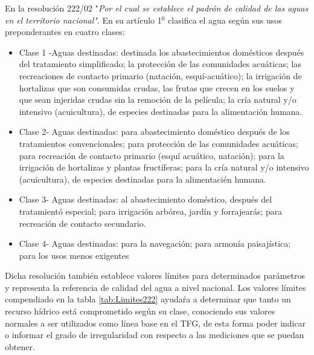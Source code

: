 En la resoluci\'on 222/02 "\textit{Por el cual se establece el padr\'on de calidad de las aguas en el territorio nacional"}. En su art\'iculo 1$^{0}$ clasifica el agua seg\'un sus usos preponderantes en cuatro clases:\cite{la-secretaria-del-ambiente-2002}
\begin{itemize}
    \item Clase 1 -Aguas destinadas: 
    destinada los abastecimientos dom\'esticos despu\'es del tratamiento simplificado; 
    la protecci\'on de las comunidades acu\'aticas;
    las recreaciones de contacto primario (nataci\'on, esqu\'i-acu\'atico); 
    la irrigaci\'on de hortalizas que son consumidas crudas, las frutas que crecen en los suelos y que sean injeridas crudas sin la remoci\'on de la pel\'icula; 
    la cr\'ia natural y/o intensivo (acuicultura), de especies destinadas para la alimentaci\'on humana.
    \item Clase 2- Aguas destinadas:
    para abastecimiento dom\'estico después de los tratamientos convencionales; 
    para protección de las comunidades acuáticas; para recreación de contacto primario (esquí acuático, natación); 
    para la irrigación de hortalizas y plantas fruct\'iferas; 
    para la cría natural y/o intensivo (acuicultura), de especies destinadas para la alimentaci\'en humana.
    \item Clase 3- Aguas destinadas: 
    al abastecimiento dom\'estico, despu\'es del tratamient\'o especial; 
    para irrigación arbórea, jardín y forrajear\'as; 
    para recreaci\'on de contacto secundario.
    \item Clase 4- Aguas destinadas: 
    para la navegación; 
    para armonía paisaj\'istica; 
    para los usos menos exigentes
\end{itemize}

Dicha resoluci\'on tambi\'en establece valores l\'imites para determinados parámetros y representa la referencia de calidad del agua a nivel nacional.
Los valores l\'imites compendiado en la tabla \ref{tab:Limites222} ayuda\'ra  a determinar que tanto un recurso h\'idrico est\'a comprometido seg\'un su clase, conociendo sus valores normales a ser utilizados como l\'inea base en el TFG, de esta forma poder indicar o informar el grado de irregularidad con respecto a las mediciones que se puedan obtener.   

